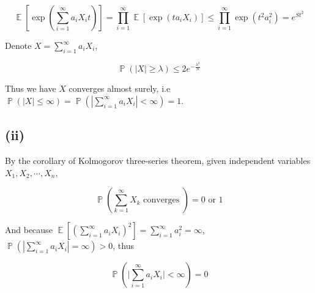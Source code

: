 \documentclass{article}
\DeclareMathOperator{\E}{\mathbb{E}}
\DeclareMathOperator{\bP}{\mathbb{P}}
\begin{document}
\begin{equation}
    \E[\exp(\sum_{i=1}^{\infty} a_iX_it) ] = \prod_{i=1}^{\infty} \E[\exp(ta_iX_i)] \leqslant  \prod_{i=1}^{\infty} \exp(t^2a_i^2)= e^{St^2}
\end{equation}

Denote $X= \sum_{i=1}^{\infty} a_iX_i$, 


\begin{equation}
    \bP(|X| \geqslant \lambda)  \leqslant 2e^{-\frac{\lambda^2}{S}}
\end{equation}

Thus we have $X$ converges almost surely, i.e $\bP(|X| \leqslant \infty) = \bP(|\sum_{i=1}^{\infty} a_iX_i| < \infty) = 1$.

\subsection{(ii)}

By the corollary of Kolmogorov three-series theorem, given independent variables $X_1,X_2,\cdots,X_n$,

\begin{equation}
    \bP\left(\sum_{k=1}^{\infty} X_{k} \text { converges }\right)=0 \text { or } 1
\end{equation}

And because $\E[(\sum_{i=1}^{\infty} a_iX_i)^2] = \sum_{i=1}^{\infty} a_i^2 = \infty$, $\bP(|\sum_{i=1}^{\infty} a_iX_i| = \infty) >0$, thus 

\begin{equation}
    \bP\left(\big|\sum_{i=1}^{\infty} a_iX_i \big| < \infty\right) = 0
\end{equation}






\end{document}
